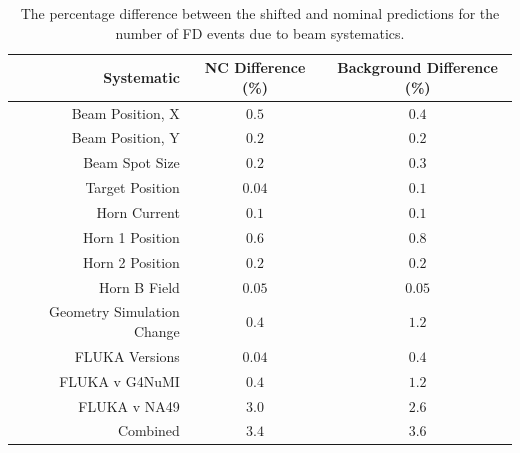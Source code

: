 \begin{table}[htb]
  \begin{center}
    \caption[Beam Systematic Errors]{The percentage difference between the shifted and nominal predictions for the number of FD events due to beam systematics.}
    \label{tab:SystBeam}
    \begin{tabular}{r c c}
      \hline\hline
      Systematic & NC Difference (\%) & Background Difference (\%) \\
      \hline
      Beam Position, X & $0.5$ & $0.4$ \\
      Beam Position, Y & $0.2$ & $0.2$ \\
      Beam Spot Size & $0.2$ & $0.3$ \\
      Target Position & $0.04$ & $0.1$ \\
      Horn Current & $0.1$ & $0.1$ \\
      Horn 1 Position & $0.6$ & $0.8$ \\
      Horn 2 Position & $0.2$ & $0.2$ \\
      Horn B Field & $0.05$ & $0.05$ \\
      Geometry Simulation Change & $0.4$ & $1.2$ \\
      FLUKA Versions & $0.04$ & $0.4$ \\
      FLUKA v G4NuMI & $0.4$ & $1.2$ \\
      FLUKA v NA49 & $3.0$ & $2.6$ \\
      \hline
      Combined & $3.4$ & $3.6$ \\
      \hline
    \end{tabular}
  \end{center}
\end{table}

